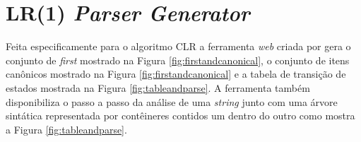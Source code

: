 \begin{figure}[ht]
    \captionsetup{width=16cm}
    {}
\end{figure}

\section{LR(1) \textit{Parser Generator}}
Feita especificamente para o algoritmo CLR a ferramenta \textit{web} criada por \textcite{LR-2024-04-12} gera o conjunto de \textit{first} mostrado na Figura \ref{fig:firstandcanonical}, o conjunto de itens canônicos mostrado na Figura \ref{fig:firstandcanonical} e a tabela de transição de estados mostrada na Figura \ref{fig:tableandparse}. A ferramenta também disponibiliza o passo a passo da análise de uma \textit{string} junto com uma árvore sintática representada por contêineres contidos um dentro do outro como mostra a Figura \ref{fig:tableandparse}.

